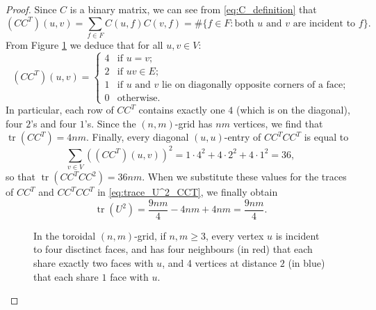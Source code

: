 \documentclass{article}
\numberwithin{equation}{section}
\DeclareMathOperator\tr{tr}
\begin{document}
\begin{proof}
Since $C$ is a binary matrix, we can see from \eqref{eq:C_definition} that
\[
(CC^T)(u,v) = \sum_{f \in F} C(u,f) C(v,f) = \#\{f \in F : \text{both $u$ and $v$ are incident to $f$}\}.
\]
From Figure \ref{fig:u_nbhood_grid} we deduce that for all $u,v \in V$:
\[
(CC^T)(u,v) = \begin{cases}
4 & \text{if $u = v$;} \\
2 & \text{if $uv \in E$;} \\
1 & \text{if $u$ and $v$ lie on diagonally opposite corners of a face;} \\
0 & \text{otherwise.}
\end{cases}
\]
In particular, each row of $CC^T$ contains exactly one $4$ (which is on the diagonal), four $2$'s and four $1$'s. Since the $(n,m)$-grid has $nm$ vertices, we find that $\tr(CC^T) = 4nm$. Finally, every diagonal $(u,u)$-entry of $CC^TCC^T$ is equal to
\[
\sum_{v \in V} ((CC^T)(u,v))^2 = 1 \cdot 4^2 + 4 \cdot 2^2 + 4 \cdot 1^2 = 36,
\]
so that $\tr(CC^TCC^2) = 36nm$. When we substitute these values for the traces of $CC^T$ and $CC^TCC^T$ in \eqref{eq:trace_U^2_CCT}, we finally obtain
\[
\tr(U^2) = \frac{9nm}{4} - 4nm + 4nm = \frac{9nm}{4}.
\]
\begin{figure}
\centering
{}
\caption{In the toroidal $(n,m)$-grid, if $n,m \geq 3$, every vertex $u$ is incident to four disctinct faces, and has four neighbours (in red) that each share exactly two faces with $u$, and 4 vertices at distance $2$ (in blue) that each share $1$ face with $u$.
\label{fig:u_nbhood_grid}}
\end{figure}
\end{proof}
\end{document}
